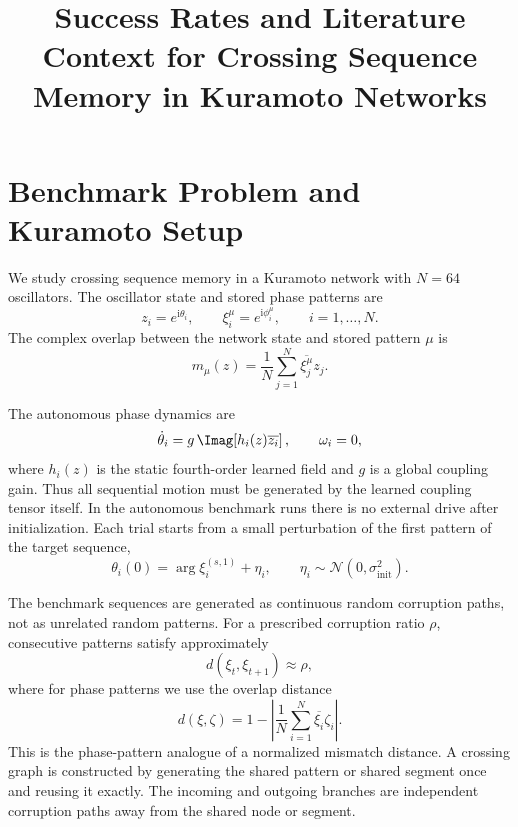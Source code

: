 \documentclass[11pt]{article}
\title{Success Rates and Literature Context for Crossing Sequence Memory in Kuramoto Networks}
\author{}
\date{}
\newcommand{\ii}{\mathrm{i}}
\newcommand{\conj}[1]{\overline{#1}}
\begin{document}
\maketitle

\section{Benchmark Problem and Kuramoto Setup}

We study crossing sequence memory in a Kuramoto network with $N=64$
oscillators.  The oscillator state and stored phase patterns are
\begin{equation}
    z_i=e^{\ii\theta_i},
    \qquad
    \xi_i^\mu=e^{\ii\phi_i^\mu},
    \qquad
    i=1,\ldots,N .
\end{equation}
The complex overlap between the network state and stored pattern $\mu$ is
\begin{equation}
    m_\mu(z)
    =
    \frac{1}{N}\sum_{j=1}^N \conj{\xi_j^\mu}z_j .
\end{equation}

The autonomous phase dynamics are
\begin{equation}
    \dot{\theta}_i
    =
    g\,\Imag\!\left[h_i(z)\conj{z_i}\right],
    \qquad
    \omega_i=0 ,
\end{equation}
where $h_i(z)$ is the static fourth-order learned field and $g$ is a global
coupling gain.  Thus all sequential motion must be generated by the learned
coupling tensor itself.  In the autonomous benchmark runs there is no external
drive after initialization.  Each trial starts from a small perturbation of the
first pattern of the target sequence,
\begin{equation}
    \theta_i(0)
    =
    \arg \xi_i^{(s,1)}
    +
    \eta_i,
    \qquad
    \eta_i\sim\mathcal{N}(0,\sigma_{\mathrm{init}}^2).
\end{equation}

The benchmark sequences are generated as continuous random corruption paths,
not as unrelated random patterns.  For a prescribed corruption ratio $\rho$,
consecutive patterns satisfy approximately
\begin{equation}
    d(\xi_t,\xi_{t+1}) \approx \rho ,
\end{equation}
where for phase patterns we use the overlap distance
\begin{equation}
    d(\xi,\zeta)
    =
    1-
    \left|
    \frac{1}{N}
    \sum_{i=1}^N
    \conj{\xi_i}\zeta_i
    \right|.
\end{equation}
This is the phase-pattern analogue of a normalized mismatch distance.  A
crossing graph is constructed by generating the shared pattern or shared segment
once and reusing it exactly.  The incoming and outgoing branches are independent
corruption paths away from the shared node or segment.
\end{document}
